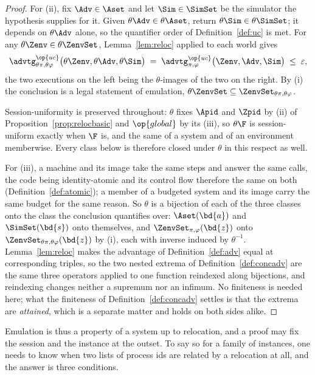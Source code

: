 \documentclass[10pt,oneside,openany]{book}
\theoremstyle{accentdef}
\theoremstyle{accentplain}
\begin{document}
\begin{proof}
For (ii), fix $\Adv \in \Aset$ and let $\Sim \in \SimSet$ be the simulator the hypothesis supplies
for it. Given $\theta\Adv \in \theta\Aset$, return $\theta\Sim \in \theta\SimSet$; it depends on
$\theta\Adv$ alone, so the quantifier order of Definition~\ref{def:uc} is met. For any
$\theta\Zenv \in \theta\ZenvSet$, Lemma~\ref{lem:reloc} applied to each world gives
\[
  \advtg^{\op{uc}}_{\theta\pi,\theta\varphi}\bigl(\theta\Zenv,\theta\Adv,\theta\Sim\bigr)
  \;=\;
  \advtg^{\op{uc}}_{\pi,\varphi}\bigl(\Zenv,\Adv,\Sim\bigr)
  \;\leq\; \varepsilon ,
\]
the two executions on the left being the $\theta$-images of the two on the right. By (i) the
conclusion is a legal statement of emulation, $\theta\ZenvSet \subseteq \ZenvSet_{\theta\pi,\theta\varphi}$.

Session-uniformity is preserved throughout: $\theta$ fixes $\Apid$ and $\Zpid$ by (ii) of
Proposition~\ref{prop:relocbasic} and $\op{global}$ by its (iii), so $\theta\F$ is session-uniform
exactly when $\F$ is, and the same of a system and of an environment memberwise. Every class below is
therefore closed under $\theta$ in this respect as well.

For (iii), a machine and its image take the same steps and answer the same calls, the code being
identity-atomic and its control flow therefore the same on both
(Definition~\ref{def:atomic}); a member of a budgeted system and its image carry the same budget for
the same reason. So $\theta$ is a bijection of each of the three classes onto the class the
conclusion quantifies over: $\Aset(\bd{a})$ and $\SimSet(\bd{s})$ onto themselves, and
$\ZenvSet_{\pi,\varphi}(\bd{z})$ onto $\ZenvSet_{\theta\pi,\theta\varphi}(\bd{z})$ by (i), each with
inverse induced by $\theta^{-1}$. Lemma~\ref{lem:reloc} makes the advantage of
Definition~\ref{def:adv} equal at corresponding triples, so the two nested extrema of
Definition~\ref{def:concadv} are the same three operators applied to one function reindexed along
bijections, and reindexing changes neither a supremum nor an infimum. No finiteness is needed here;
what the finiteness of Definition~\ref{def:concadv} settles is that the extrema are \emph{attained},
which is a separate matter and holds on both sides alike.
\end{proof}

Emulation is thus a property of a system up to relocation, and a proof may fix the session and the
instance at the outset. To say so for a family of instances, one needs to know when two lists of
process ids are related by a relocation at all, and the answer is three conditions.
\end{document}
